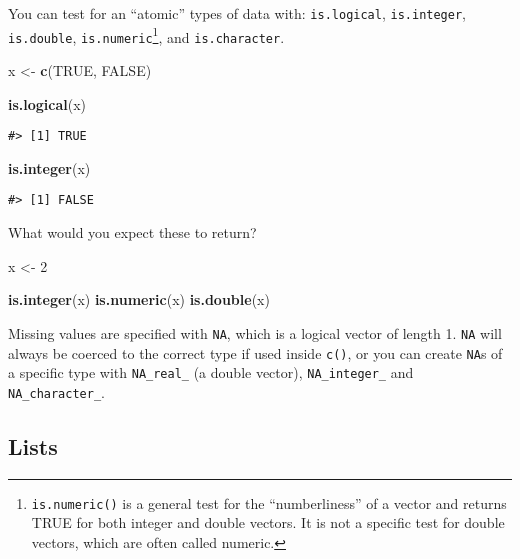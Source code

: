 \documentclass[]{book}
\newenvironment{Shaded}{\begin{snugshade}}{\end{snugshade}}
\newcommand{\KeywordTok}[1]{\textcolor[rgb]{0.13,0.29,0.53}{\textbf{#1}}}
\newcommand{\DecValTok}[1]{\textcolor[rgb]{0.00,0.00,0.81}{#1}}
\newcommand{\StringTok}[1]{\textcolor[rgb]{0.31,0.60,0.02}{#1}}
\newcommand{\OtherTok}[1]{\textcolor[rgb]{0.56,0.35,0.01}{#1}}
\newcommand{\NormalTok}[1]{#1}
\let\rmarkdownfootnote\footnote%
\def\footnote{\protect\rmarkdownfootnote}
\theoremstyle{definition}
\theoremstyle{definition}
\theoremstyle{definition}
\theoremstyle{remark}
\begin{document}
You can test for an ``atomic'' types of data with: \texttt{is.logical},
\texttt{is.integer}, \texttt{is.double}, \texttt{is.numeric}\footnote{\texttt{is.numeric()}
  is a general test for the ``numberliness'' of a vector and returns
  TRUE for both integer and double vectors. It is not a specific test
  for double vectors, which are often called numeric.}, and
\texttt{is.character}.

\begin{Shaded}
\begin{Highlighting}[]
\NormalTok{x <-}\StringTok{ }\KeywordTok{c}\NormalTok{(}\OtherTok{TRUE}\NormalTok{, }\OtherTok{FALSE}\NormalTok{)}

\KeywordTok{is.logical}\NormalTok{(x)}
\end{Highlighting}
\end{Shaded}

\begin{verbatim}
#> [1] TRUE
\end{verbatim}

\begin{Shaded}
\begin{Highlighting}[]
\KeywordTok{is.integer}\NormalTok{(x)}
\end{Highlighting}
\end{Shaded}

\begin{verbatim}
#> [1] FALSE
\end{verbatim}

What would you expect these to return?

\begin{Shaded}
\begin{Highlighting}[]
\NormalTok{x <-}\StringTok{ }\DecValTok{2}

\KeywordTok{is.integer}\NormalTok{(x)}
\KeywordTok{is.numeric}\NormalTok{(x)}
\KeywordTok{is.double}\NormalTok{(x)}
\end{Highlighting}
\end{Shaded}

Missing values are specified with \texttt{NA}, which is a logical vector
of length 1. \texttt{NA} will always be coerced to the correct type if
used inside \texttt{c()}, or you can create \texttt{NA}s of a specific
type with \texttt{NA\_real\_} (a double vector), \texttt{NA\_integer\_}
and \texttt{NA\_character\_}.

\subsection{Lists}\label{lists}
\end{document}
